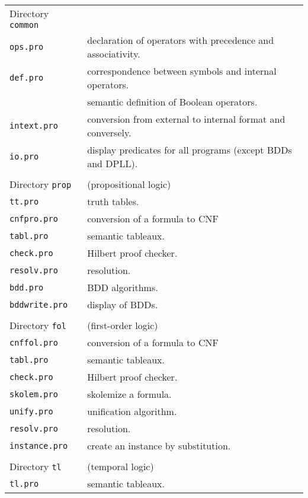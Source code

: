 \documentclass[11pt]{article}
\newcommand*{\p}[1]{\textup{\texttt{#1}}}
\begin{document}
\begin{tabular}{l@{\hspace{3em}}l}
Directory \p{common}&\\
\p{ops.pro}      & declaration of operators with precedence and
associativity.\\
\p{def.pro}      & correspondence between symbols and internal operators.\\
            & semantic definition of Boolean operators.\\
\p{intext.pro}   & conversion from external to internal format and conversely.\\
\p{io.pro}       & display predicates for all programs (except BDDs and DPLL).\\
\\
Directory \p{prop} &  (propositional logic)\\
\p{tt.pro}       & truth tables.\\
\p{cnfpro.pro}   & conversion of a formula to CNF\\
\p{tabl.pro}     & semantic tableaux.\\
\p{check.pro}    & Hilbert proof checker.\\
\p{resolv.pro}   & resolution.\\
\p{bdd.pro}      & BDD algorithms.\\
\p{bddwrite.pro} & display of BDDs.\\
\\
Directory \p{fol}  & (first-order logic)\\
\p{cnffol.pro}   & conversion of a formula to CNF\\
\p{tabl.pro}     & semantic tableaux.\\
\p{check.pro}    & Hilbert proof checker.\\
\p{skolem.pro}   & skolemize a formula.\\
\p{unify.pro}    & unification algorithm.\\
\p{resolv.pro}   & resolution.\\
\p{instance.pro} & create an instance by substitution.\\
\\
Directory \p{tl}  &   (temporal logic)\\
\p{tl.pro}       & semantic tableaux.\\
\end{tabular}
\end{document}

